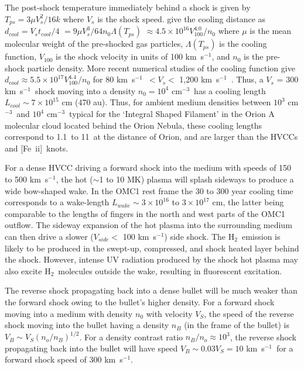 \documentclass{aa}
\newcommand{\cmq}{cm{$^{-3}$}}
\newcommand{\kms}{km~s{$^{-1}$}}
\newcommand{\Feii}{[Fe~{\sc ii}]}
\newcommand{\hh}{\ensuremath{\textrm{H}_{2}}}			%
\begin{document}
The post-shock temperature immediately behind a  shock is  given by 
$T_{ps} = 3 \mu V_s^2/ 16 k$ where $V_s$  is the 
shock speed.   \citet{Blondin1990} give the cooling distance as
$d_{cool} = V_s t_{cool} / 4$ $= 9 \mu V_s^3 / 64 n_0 \Lambda (T_{ps})$
$ \approx 4.5 \times 10^{16} V_{100}^{4.0} / n_0$ 
where $\mu$ is the mean molecular weight of the pre-shocked gas particles, 
$\Lambda (T_{ps})$ is the cooling function,  $V_{100}$ is the
shock velocity in units of 100 \kms , and $n_0$ is the pre-shock particle density.   
More recent numerical studies of the cooling function give 
$d_{cool} \approx 5.5 \times 10^{17} V_{100}^{4.4} / n_0$  for $80$ \kms\
$< V_s <$ 1,200 \kms\ \citep{Draine2011}.  Thus, a $V_s$ = 300 \kms\ shock
moving into a density $n_0 = 10^4$ \cmq\ has a cooling length 
$L_{cool} \sim 7 \times 10^{15}$ cm (470 au).  Thus, for ambient medium 
densities between $10^3$ \cmq\ and $10^4$ \cmq\  typical for the 
`Integral Shaped Filament' in the Orion A molecular cloud located behind the 
Orion Nebula, these cooling  lengths correspond to 1.1\arcsec\   to 11\arcsec\   
at the distance of Orion, and are larger than the HVCCs and \Feii\  knots.   

For a dense HVCC driving a forward shock into the medium with  speeds of 150 to 500 
\kms , the hot ($\sim$1 to 10 MK) plasma will splash sideways to produce a wide
bow-shaped wake.    In the OMC1 rest frame the 30 to 300 year cooling time corresponds 
to a wake-length  $L_{wake} \sim 3 \times 10^{16}$ to $3 \times 10^{17}$ cm, the
latter being comparable to the lengths of fingers in the north and west parts of the 
OMC1 outflow.    The sideway expansion of the hot plasma into the surrounding 
medium can then drive  a slower ($V_{side} < $ 100 \kms ) side shock.   The  \hh\ emission
is likely to be produced in the swept-up, compressed, and shock heated layer  
behind the shock.   However, intense UV radiation produced by the shock hot plasma
may also excite \hh\ molecules outside the wake, resulting in fluorescent 
excitation.

The reverse shock propagating back into a dense bullet will be much weaker than the 
forward shock owing to the bullet's higher density.  For a forward shock moving into a medium 
with density $n_0$ with velocity $V_S$, the speed of the reverse shock moving into the 
bullet having a density $n_B$ (in the frame of the bullet) is  $V_B \sim V_S (n_o/n_B)^{1/2}$.  
For a density contrast ratio  $n_B / n_o \approx 10^3$,  the reverse shock 
propagating back into the bullet will have  speed $V_B \sim 0.03 V_S = 10$ \kms\ 
for a forward shock speed of 300 \kms .
\end{document}

